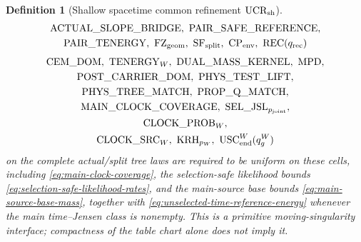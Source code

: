 \documentclass[11pt]{article}
\newtheorem{definition}[theorem]{Definition}
\begin{document}
\begin{definition}[Shallow spacetime common refinement
$\mathrm{UCR}_{\rm sh}$]
\[\begin{gathered}
 \mathrm{ACTUAL\_SLOPE\_BRIDGE},\ \mathrm{PAIR\_SAFE\_REFERENCE},\\
 \mathrm{PAIR\_TENERGY},\ \mathrm{FZ}_{\rm geom},\
 \mathrm{SF}_{\rm split},\ \mathrm{CP}_{\rm env},\
 \mathrm{REC}(q_{\rm rec})
 \end{gathered}
\]
\[
 \begin{gathered}
 \mathrm{CEM\_DOM},\ \mathrm{TENERGY}_{W},\
 \mathrm{DUAL\_MASS\_KERNEL},\ \mathrm{MPD},\\
 \mathrm{POST\_CARRIER\_DOM},\ \mathrm{PHYS\_TEST\_LIFT},\\
 \mathrm{PHYS\_TREE\_MATCH},\ \mathrm{PROP\_Q\_MATCH},\\
 \mathrm{MAIN\_CLOCK\_COVERAGE},\
 \mathrm{SEL\_JSL}_{p_{\rm joint}},\\
 \mathrm{CLOCK\_PROB}_{W},\\
 \mathrm{CLOCK\_SRC}_{W},\ \mathrm{KRH}_{p_W},\
 \mathrm{USC}_{\rm end}^{W}(q_g^W)
 \end{gathered}
\]
on the complete actual/split tree laws are required to be uniform on these
cells, including \eqref{eq:main-clock-coverage}, the selection-safe
likelihood bounds \eqref{eq:selection-safe-likelihood-rates}, and the
main-source base bounds \eqref{eq:main-source-base-mass}, together with
\eqref{eq:unselected-time-reference-energy} whenever the main time--Jensen
class is nonempty.
This is a primitive moving-singularity interface; compactness of the table
chart alone does not imply it.
\end{definition}
\end{document}
